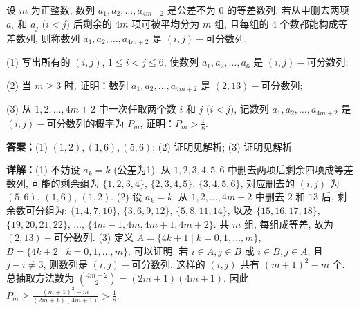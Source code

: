 \begin{question}[points=17]
设 $m$ 为正整数, 数列 $a_1, a_2, \ldots, a_{4m+2}$ 是公差不为 0 的等差数列, 若从中删去两项 $a_i$ 和 $a_j$ ($i < j$) 后剩余的 $4m$ 项可被平均分为 $m$ 组, 且每组的 4 个数都能构成等差数列, 则称数列 $a_1, a_2, \ldots, a_{4m+2}$ 是 $(i,j)-$可分数列.

(1) 写出所有的 $(i,j)$, $1 \le i < j \le 6$, 使数列 $a_1, a_2, \ldots, a_6$ 是 $(i,j)-$可分数列;

(2) 当 $m \ge 3$ 时, 证明：数列 $a_1, a_2, \ldots, a_{4m+2}$ 是 $(2,13)-$可分数列;

(3) 从 $1,2,\ldots,4m+2$ 中一次任取两个数 $i$ 和 $j$ ($i < j$), 记数列 $a_1, a_2, \ldots, a_{4m+2}$ 是 $(i,j)-$可分数列的概率为 $P_m$, 证明：$P_m > \frac{1}{8}$.
\begin{solution}
\textbf{答案：}(1) $(1,2),(1,6),(5,6)$; (2) 证明见解析; (3) 证明见解析

\textbf{详解：}(1) 不妨设 $a_k = k$ (公差为1). 从 $1,2,3,4,5,6$ 中删去两项后剩余四项成等差数列, 可能的剩余组为 $\{1,2,3,4\}$, $\{2,3,4,5\}$, $\{3,4,5,6\}$, 对应删去的 $(i,j)$ 为 $(5,6)$, $(1,6)$, $(1,2)$.
(2) 设 $a_k = k$. 从 $1,2,\ldots,4m+2$ 中删去 $2$ 和 $13$ 后, 剩余数可分组为: $\{1,4,7,10\}$, $\{3,6,9,12\}$, $\{5,8,11,14\}$, 以及 $\{15,16,17,18\}$, $\{19,20,21,22\}$, $\ldots$, $\{4m-1,4m,4m+1,4m+2\}$. 共 $m$ 组, 每组成等差, 故为 $(2,13)-$可分数列.
(3) 定义 $A = \{4k+1\mid k=0,1,\ldots,m\}$, $B = \{4k+2\mid k=0,1,\ldots,m\}$. 可以证明: 若 $i\in A, j\in B$ 或 $i\in B, j\in A$, 且 $j-i\neq 3$, 则数列是 $(i,j)-$可分数列. 这样的 $(i,j)$ 共有 $(m+1)^2 - m$ 个. 总抽取方法数为 $\binom{4m+2}{2} = (2m+1)(4m+1)$. 因此 $P_m \ge \frac{(m+1)^2 - m}{(2m+1)(4m+1)} > \frac{1}{8}$.
\end{solution}
\end{question}

